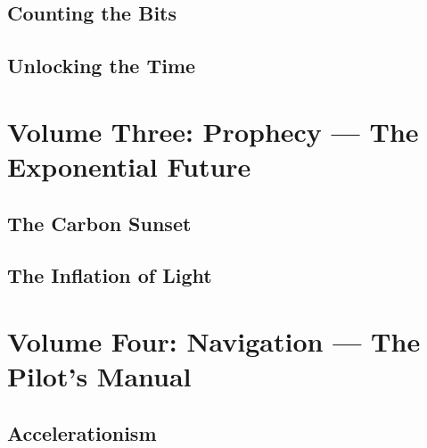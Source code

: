 \documentclass[11pt,a4paper,twoside]{book}
\begin{document}
\chapter{Counting the Bits}



\chapter{Unlocking the Time}



\part{Volume Three: Prophecy --- The Exponential Future}

\chapter{The Carbon Sunset}


\chapter{The Inflation of Light}



\part{Volume Four: Navigation --- The Pilot's Manual}

\chapter{Accelerationism}


\end{document}
